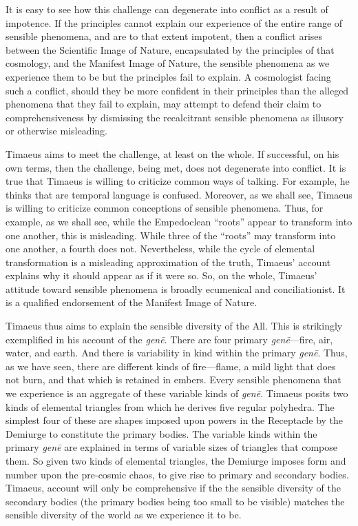 It is easy to see how this challenge can degenerate into conflict as a result of impotence. If the principles cannot explain our experience of the entire range of sensible phenomena, and are to that extent impotent, then a conflict arises between the Scientific Image of Nature, encapsulated by the principles of that cosmology, and the Manifest Image of Nature, the sensible phenomena as we experience them to be but the principles fail to explain. A cosmologist facing such a conflict, should they be more confident in their principles than the alleged phenomena that they fail to explain, may attempt to defend their claim to comprehensiveness by dismissing the recalcitrant sensible phenomena as illusory or otherwise misleading.

Timaeus aims to meet the challenge, at least on the whole. If successful, on his own terms, then the challenge, being met, does not degenerate into conflict. It is true that Timaeus is willing to criticize common ways of talking. For example, he thinks that are temporal language is confused. Moreover, as we shall see, Timaeus is willing to criticize common conceptions of sensible phenomena. Thus, for example, as we shall see, while the Empedoclean ``roots'' appear to transform into one another, this is misleading. While three of the ``roots'' may transform into one another, a fourth does not. Nevertheless, while the cycle of elemental transformation is a misleading approximation of the truth, Timaeus' account explains why it should appear as if it were so. So, on the whole, Timaeus' attitude toward sensible phenomena is broadly ecumenical and conciliationist. It is a qualified endorsement of the Manifest Image of Nature.

Timaeus thus aims to explain the sensible diversity of the All. This is strikingly exemplified in his account of the \emph{genē}. There are four primary \emph{genē}---fire, air, water, and earth. And there is variability in kind within the primary \emph{genē}. Thus, as we have seen, there are different kinds of fire---flame, a mild light that does not burn, and that which is retained in embers. Every sensible phenomena that we experience is an aggregate of these variable kinds of \emph{genē}. Timaeus posits two kinds of elemental triangles from which he derives five regular polyhedra. The simplest four of these are shapes imposed upon powers in the Receptacle by the Demiurge to constitute the primary bodies. The variable kinds within the primary \emph{genē} are explained in terms of variable sizes of triangles that compose them. So given two kinds of elemental triangles, the Demiurge imposes form and number upon the pre-cosmic chaos, to give rise to primary and secondary bodies. Timaeus, account will only be comprehensive if the the sensible diversity of the secondary bodies (the primary bodies being too small to be visible) matches the sensible diversity of the world as we experience it to be.

